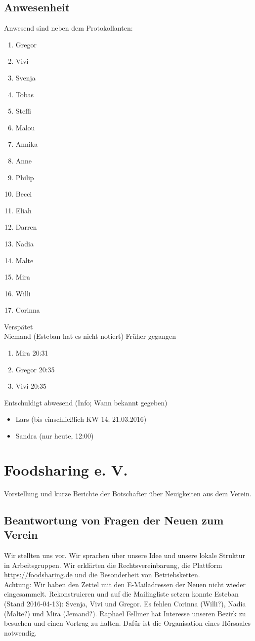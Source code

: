 \documentclass{scrreprt}
\begin{document}
\section{Anwesenheit}
Anwesend sind neben dem Protokollanten:
\begin{enumerate}
\item Gregor
\item Vivi
\item Svenja
\item Tobas
\item Steffi
\item Malou
\item Annika
\item Anne
\item Philip
\item Becci
\item Eliah
\item Darren
\item Nadia
\item Malte
\item Mira
\item Willi
\item Corinna
\end{enumerate}
Verspätet\\
Niemand (Esteban hat es nicht notiert)
Früher gegangen
\begin{enumerate}
\item Mira 20:31
\item Gregor 20:35
\item Vivi 20:35
\end{enumerate}
Entschuldigt abwesend (Info; Wann bekannt gegeben)
\begin{itemize}
\item Lars (bis einschließlich KW 14; 21.03.2016)
\item Sandra (nur heute, 12:00)
\end{itemize}
\chapter{Foodsharing e. V.}
Vorstellung und kurze Berichte der Botschafter über Neuigkeiten aus dem Verein. 
\section{Beantwortung von Fragen der Neuen zum Verein}
Wir stellten uns vor. Wir sprachen über unsere Idee und unsere lokale Struktur in Arbeitsgruppen. Wir erklärten die Rechtsvereinbarung, die Plattform \url{https://foodsharing.de} und die Besonderheit von Betriebsketten.\\
Achtung: Wir haben den Zettel mit den E-Mailadressen der Neuen nicht wieder eingesammelt. Rekonstruieren und auf die Mailingliste setzen konnte Esteban (Stand 2016-04-13): Svenja, Vivi und Gregor. Es fehlen Corinna (Willi?), Nadia (Malte?) und Mira (Jemand?). Raphael Fellmer hat Interesse unseren Bezirk zu besuchen und einen Vortrag zu halten. Dafür ist die Organisation eines Hörsaales notwendig.
\end{document}
